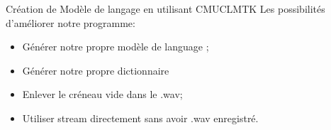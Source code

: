\begin{frame}{Création de Modèle de langage en utilisant CMUCLMTK}
Les possibilités d'améliorer notre programme:
\begin{itemize}
\item Générer notre propre modèle de language ;
\item Générer notre propre dictionnaire
\item Enlever le créneau vide dans le .wav;
\item Utiliser stream directement sans avoir .wav enregistré.
\end{itemize}
\end{frame}

